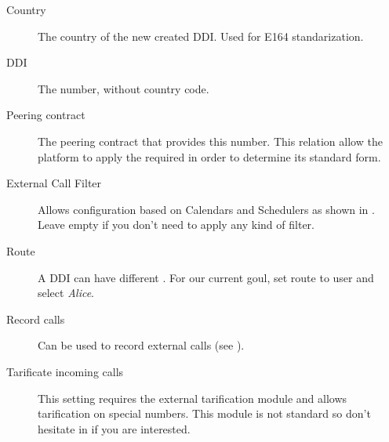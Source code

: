 \documentclass[letterpaper,10pt,english]{sphinxmanual}
\begin{document}
\label{external_incoming_calls/configure_ddi:bill-inbound}\begin{description}
\item[{Country}] \leavevmode{}\label{external_incoming_calls/configure_ddi:term-country}
The country of the new created DDI. Used for E164 standarization.

\item[{DDI}] \leavevmode{}\label{external_incoming_calls/configure_ddi:term-ddi}
The number, without country code.

\item[{Peering contract}] \leavevmode{}\label{external_incoming_calls/configure_ddi:term-peering-contract}
The peering contract that provides this number. This relation allow
the platform to apply the required {\hyperref[external_incoming_calls/numeric_transformations:numeric\string-transformations]{}} in
order to determine its standard form.

\item[{External Call Filter}] \leavevmode{}\label{external_incoming_calls/configure_ddi:term-external-call-filter}
Allows configuration based on Calendars and Schedulers as shown in
{\hyperref[pbx_features/external_filters:external\string-filters]{}}. Leave empty if you don't need to apply any
kind of filter.

\item[{Route}] \leavevmode{}\label{external_incoming_calls/configure_ddi:term-route}
A DDI can have different {\hyperref[pbx_features/external_ddis:routing\string-logics]{}}. For our
current goul, set route to user and select \emph{Alice}.

\item[{Record calls}] \leavevmode{}\label{external_incoming_calls/configure_ddi:term-record-calls}
Can be used to record external calls (see {\hyperref[pbx_features/call_recording:call\string-recordings]{}}).

\item[{Tarificate incoming calls}] \leavevmode{}\label{external_incoming_calls/configure_ddi:term-tarificate-incoming-calls}
This setting requires the external tarification module and allows
tarification on special numbers. This module is not standard so don't
hesitate in {\hyperref[intro/getting_help:getting\string-help]{}} if you are interested.

\end{description}
\end{document}
